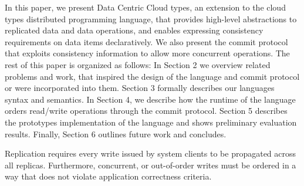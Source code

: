 In this paper, we present Data Centric Cloud types, an extension to the cloud
types distributed programming language, that provides high-level abstractions to replicated
data and data operations, and enables expressing consistency requirements on
data items declaratively. We also present the commit protocol that exploits
consistency information to allow more concurrent operations. The rest of this paper
is organized as follows: In Section 2 we overview related problems and work,
that inspired the design of the language and commit protocol or were
incorporated into them. Section 3 formally describes our languages syntax and
semantics. In Section 4, we describe how the runtime of the language orders
read/write operations through the commit protocol. Section 5 describes the
prototypes implementation of the language and shows preliminary evaluation
results. Finally, Section 6 outlines future work and concludes. 





Replication requires every write issued by system clients to be
propagated across all replicas. Furthermore, concurrent, or out-of-order writes
must be ordered in a way that does not violate application correctness criteria.  


